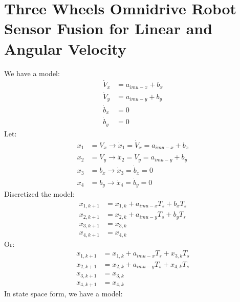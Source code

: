 \section{Three Wheels Omnidrive Robot Sensor Fusion for Linear and Angular Velocity}
	We have a model:
	\begin{equation}
		\begin{split}
			\dot{V}_x &= a_{imu-x} + b_x \\
			\dot{V}_y &= a_{imu-y} + b_y \\
			\dot{b}_x &= 0 \\
			\dot{b}_y &= 0
		\end{split}
		\label{sensorfuseq16}
	\end{equation}
	Let:
	\[\begin{split}
		x_1 &= V_x \rightarrow \dot{x}_1 = \dot{V}_x = a_{imu-x} + b_x \\
		x_2 &= V_y \rightarrow \dot{x}_2 = \dot{V}_y = a_{imu-y} + b_y \\
		x_3 &= b_x \rightarrow \dot{x}_3 = \dot{b}_x = 0 \\
		x_4 &= b_y \rightarrow \dot{x}_4 = \dot{b}_y = 0
	\end{split}\]
	Discretized the model:
	\[\begin{split}
		x_{1,k+1} &= x_{1,k} + a_{imu-x}T_s + b_xT_s \\
		x_{2,k+1} &= x_{2,k} + a_{imu-y}T_s + b_yT_s \\
		x_{3,k+1} &= x_{3,k} \\
		x_{4,k+1} &= x_{4,k}
	\end{split}\]
	Or:
	\[\begin{split}
		x_{1,k+1} &= x_{1,k} + a_{imu-x}T_s + x_{3,k}T_s \\
		x_{2,k+1} &= x_{2,k} + a_{imu-y}T_s + x_{4,k}T_s \\
		x_{3,k+1} &= x_{3,k} \\
		x_{4,k+1} &= x_{4,k}
	\end{split}\]
	In state space form, we have a model:
